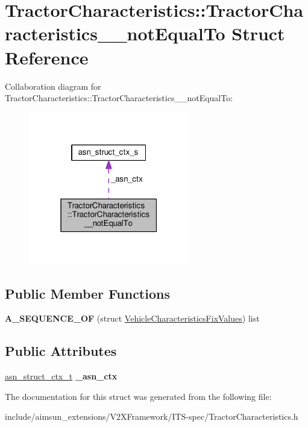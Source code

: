\hypertarget{structTractorCharacteristics_1_1TractorCharacteristics____notEqualTo}{}\section{Tractor\+Characteristics\+:\+:Tractor\+Characteristics\+\_\+\+\_\+not\+Equal\+To Struct Reference}
\label{structTractorCharacteristics_1_1TractorCharacteristics____notEqualTo}


Collaboration diagram for Tractor\+Characteristics\+:\+:Tractor\+Characteristics\+\_\+\+\_\+not\+Equal\+To\+:\nopagebreak
\begin{figure}[H]
\begin{center}
\leavevmode
\includegraphics[width=199pt]{structTractorCharacteristics_1_1TractorCharacteristics____notEqualTo__coll__graph}
\end{center}
\end{figure}
\subsection*{Public Member Functions}
\begin{DoxyCompactItemize}
\item 
{\bfseries A\+\_\+\+S\+E\+Q\+U\+E\+N\+C\+E\+\_\+\+OF} (struct \hyperlink{structVehicleCharacteristicsFixValues}{Vehicle\+Characteristics\+Fix\+Values}) list\hypertarget{structTractorCharacteristics_1_1TractorCharacteristics____notEqualTo_a43e1e3b450f4e45f0923a0340dba6ccb}{}\label{structTractorCharacteristics_1_1TractorCharacteristics____notEqualTo_a43e1e3b450f4e45f0923a0340dba6ccb}

\end{DoxyCompactItemize}
\subsection*{Public Attributes}
\begin{DoxyCompactItemize}
\item 
\hyperlink{structasn__struct__ctx__s}{asn\+\_\+struct\+\_\+ctx\+\_\+t} {\bfseries \+\_\+asn\+\_\+ctx}\hypertarget{structTractorCharacteristics_1_1TractorCharacteristics____notEqualTo_ad10dc68a1b3b8ffdb213bb4e69bfa730}{}\label{structTractorCharacteristics_1_1TractorCharacteristics____notEqualTo_ad10dc68a1b3b8ffdb213bb4e69bfa730}

\end{DoxyCompactItemize}


The documentation for this struct was generated from the following file\+:\begin{DoxyCompactItemize}
\item 
include/aimsun\+\_\+extensions/\+V2\+X\+Framework/\+I\+T\+S-\/spec/Tractor\+Characteristics.\+h\end{DoxyCompactItemize}
